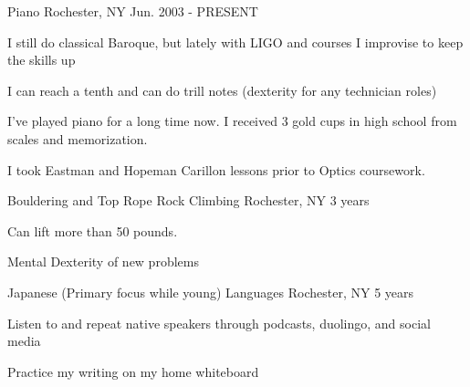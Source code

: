 \begin{cventries}
  \cventry
  {}
    {Piano}
    {Rochester, NY}
    {Jun. 2003 - PRESENT}
    {
      \begin{cvitems}
      \item{I still do classical Baroque, but lately with LIGO and courses I improvise to keep the skills up }
      \item{I can reach a tenth and can do trill notes (dexterity for any technician roles)}
        \item {I've played piano for a long time now. I received 3 gold cups in high school from scales and memorization. }
        \item {I took  Eastman and Hopeman Carillon lessons prior to Optics coursework.}
      \end{cvitems}
    }
  \cventry
  {Bouldering and Top Rope}
    {Rock Climbing}
    {Rochester, NY}
    {3 years}
    {
      \begin{cvitems}
        \item {Can lift more than 50 pounds.}
        \item{Mental Dexterity of new problems}
      \end{cvitems}
    }
    \cventry
    {Japanese (Primary focus while young)}
    {Languages}
    {Rochester, NY}
    {5 years}
    {
      \begin{cvitems}
        \item {Listen to and repeat native speakers through podcasts, duolingo, and social media}
        \item{Practice my writing on my home whiteboard}
      \end{cvitems}
    }
    

\end{cventries}
